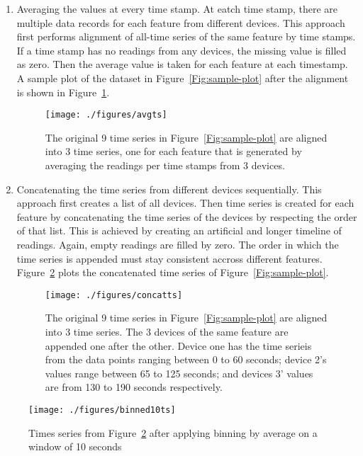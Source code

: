 \begin{enumerate}
	\item Averaging the values at every time stamp. At eatch time stamp, there are multiple data records for each feature from different devices. This approach first performs alignment of all-time series of the same feature by time stamps. If a time stamp has no readings from any devices, the missing value is filled as zero. Then the average value is taken for each feature at each timestamp. A sample plot of the dataset in Figure~\ref{Fig:sample-plot} after the alignment is shown in Figure~\ref{Fig:alignment-timeseries}.
	
	\begin{figure}
		\centering		
		\texttt{[image: ./figures/avgts]}
		\caption{ The original 9 time series in Figure~\ref{Fig:sample-plot} are aligned into 3 time series, one for each feature that is generated by averaging the readings per time stamps from 3 devices.}
		\label{Fig:alignment-timeseries}
	\end{figure}
	
	\item Concatenating the time series from different devices sequentially. This approach first creates a list of all devices. Then time series is created for each feature by concatenating the time series of the devices by respecting the order of that list. This is achieved by creating an artificial and longer timeline of readings. Again, empty readings are filled by zero. The order in which the time series is appended must stay consistent accross different features. Figure~\ref{Fig:alignment-concatenate} plots the concatenated time series of Figure~\ref{Fig:sample-plot}.
	
	\begin{figure}
		\texttt{[image: ./figures/concatts]}
		\caption{The original 9 time series in Figure~\ref{Fig:sample-plot} are aligned into 3 time series.  The 3 devices of the same feature are appended one after the other. Device one has the time serieis from the data points ranging between 0 to 60 seconds; device 2's values range between 65 to 125 seconds; and devices 3' values are from 130 to 190 seconds respectively.}
		\label{Fig:alignment-concatenate}
	\end{figure}
	
\end{enumerate}


\begin{figure}
	\texttt{[image: ./figures/binned10ts]}
	\caption{Times series from Figure~\ref{Fig:alignment-concatenate} after applying binning by average on a window of 10 seconds}
	\label{Fig:binning-10}
\end{figure}

